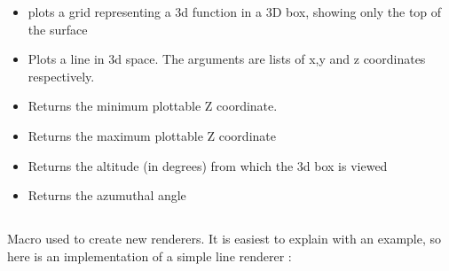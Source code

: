 \documentclass{article}
\begin{document}
{{{{{{{\begin{itemize}
\item 
{}

plots a grid representing a 3d function in a 3D box, showing only the top of the surface

\item 
{}

Plots a line in 3d space. The arguments are lists of x,y and z coordinates respectively.


\item 
{}


Returns the minimum plottable Z coordinate. 


\item 
{}


Returns the maximum plottable Z coordinate


\item 
{}


Returns the altitude (in degrees) from which the 3d box is viewed


\item 
{}


Returns the azumuthal angle


\end{itemize}
\subsection{}

\label{r-lambda}


Macro used to create new renderers. It is easiest to explain with  an example, so here is an implementation of a simple line renderer :
\begin{schemedisplay}


\end{schemedisplay}}}}}}}}
\end{document}

